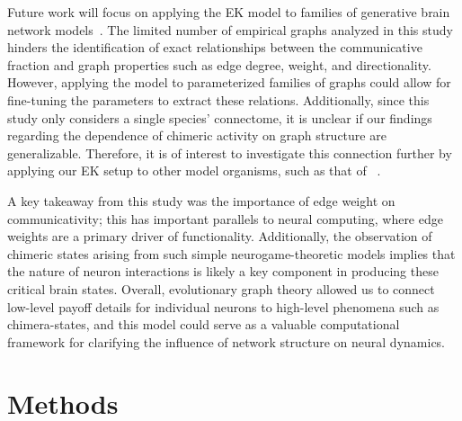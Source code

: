 \documentclass[pdflatex,twocolumn,sn-nature,super]{sn-jnl}
\begin{document}
Future work will focus on applying the EK model
to families of generative brain network models~\citep{betzel2016generative}.
The limited number of empirical graphs analyzed in this study
hinders the identification of exact relationships
between the communicative fraction and graph properties
such as edge degree, weight, and directionality.
However, applying the model to parameterized families of graphs could allow
for fine-tuning the parameters to extract these relations.
Additionally, since this study only considers a single species' connectome,
it is unclear if our findings regarding the dependence
of chimeric activity on graph structure are generalizable.
Therefore, it is of interest to investigate this connection further
by applying our EK setup to other model organisms,
such as that of
~\citep{schlegel2024whole}.

A key takeaway from this study was the importance
of edge weight on communicativity;
this has important parallels to neural computing,
where edge weights are a primary driver of functionality.
Additionally, the observation of chimeric states
arising from such simple neurogame-theoretic models
implies that the nature of neuron interactions is likely
a key component in producing these critical brain states.
Overall, evolutionary graph theory allowed us
to connect low-level payoff details for individual neurons
to high-level phenomena such as chimera-states,
and this model could serve as a valuable computational framework
for clarifying the influence of network structure on neural dynamics.

\section{Methods}\label{sec:methods}
\end{document}
